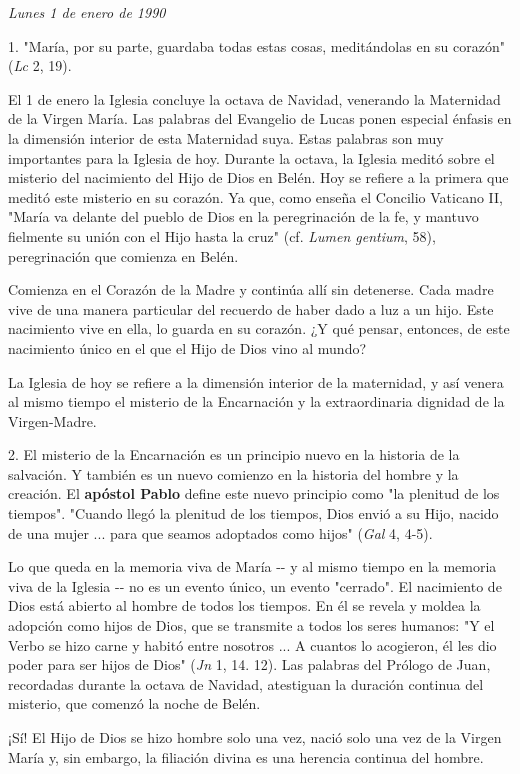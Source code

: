\begin{body}
\emph{Lunes 1 de enero de 1990}

1. "María, por su parte, guardaba todas estas cosas, meditándolas en su
corazón" (\emph{Lc} 2, 19).

El 1 de enero la Iglesia concluye la octava de Navidad, venerando la
Maternidad de la Virgen María. Las palabras del Evangelio de Lucas ponen
especial énfasis en la dimensión interior de esta Maternidad suya. Estas
palabras son muy importantes para la Iglesia de hoy. Durante la octava,
la Iglesia meditó sobre el misterio del nacimiento del Hijo de Dios en
Belén. Hoy se refiere a la primera que meditó este misterio en su
corazón. Ya que, como enseña el Concilio Vaticano II, "María va delante
del pueblo de Dios en la peregrinación de la fe, y mantuvo fielmente su
unión con el Hijo hasta la cruz" (cf. \emph{Lumen gentium}, 58),
peregrinación que comienza en Belén.

Comienza en el Corazón de la Madre y continúa allí sin detenerse. Cada
madre vive de una manera particular del recuerdo de haber dado a luz a
un hijo. Este nacimiento vive en ella, lo guarda en su corazón. ¿Y qué
pensar, entonces, de este nacimiento único en el que el Hijo de Dios
vino al mundo?

La Iglesia de hoy se refiere a la dimensión interior de la maternidad, y
así venera al mismo tiempo el misterio de la Encarnación y la
extraordinaria dignidad de la Virgen-Madre.

2. El misterio de la Encarnación es un principio nuevo en la historia de
la salvación. Y también es un nuevo comienzo en la historia del hombre y
la creación. El \textbf{apóstol Pablo} define este nuevo principio como
"la plenitud de los tiempos". "Cuando llegó la plenitud de los tiempos,
Dios envió a su Hijo, nacido de una mujer ... para que seamos adoptados
como hijos" (\emph{Gal} 4, 4-5).

Lo que queda en la memoria viva de María -\/- y al mismo tiempo en la
memoria viva de la Iglesia -\/- no es un evento único, un evento
"cerrado". El nacimiento de Dios está abierto al hombre de todos los
tiempos. En él se revela y moldea la adopción como hijos de Dios, que se
transmite a todos los seres humanos: "Y el Verbo se hizo carne y habitó
entre nosotros ... A cuantos lo acogieron, él les dio poder para ser
hijos de Dios" (\emph{Jn} 1, 14. 12). Las palabras del Prólogo de Juan,
recordadas durante la octava de Navidad, atestiguan la duración continua
del misterio, que comenzó la noche de Belén.

¡Sí! El Hijo de Dios se hizo hombre solo una vez, nació solo una vez de
la Virgen María y, sin embargo, la filiación divina es una herencia
continua del hombre.


\end{body}
